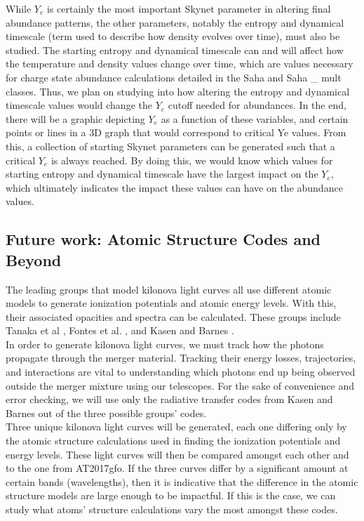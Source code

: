 \documentclass[11pt,a4paper]{article}
\begin{document}
While $Y_e$ is certainly the most important Skynet parameter in altering final abundance patterns, the other parameters, notably the entropy and dynamical timescale (term used to describe how density evolves over time), must also be studied. The starting entropy and dynamical timescale can and will affect how the temperature and density values change over time, which are values necessary for charge state abundance calculations detailed in the Saha and Saha \_ mult classes. 
Thus, we plan on studying into how altering the entropy and dynamical timescale values would change the $Y_e$ cutoff needed for abundances. In the end, there will be a graphic depicting $Y_e$ as a function of these variables, and certain points or lines in a 3D graph that would correspond to critical Ye values. From this, a collection of starting Skynet parameters can be generated such that a critical $Y_e$ is always reached. By doing this, we would know which values for starting entropy and dynamical timescale have the largest impact on the $Y_e$, which ultimately indicates the impact these values can have on the abundance values. 


\subsection{Future work: Atomic Structure Codes and Beyond}

The leading groups that model kilonova light curves all use different atomic models to generate ionization potentials and atomic energy levels. With this, their associated opacities and spectra can be calculated.  These groups include Tanaka et al \cite{Tanaka_2018} , Fontes et al. \cite{Fontes_2020} , and Kasen and Barnes \cite{Barnes_Kasen_2013} . \\

In order to generate kilonova light curves, we must track how the photons propagate through the merger material. Tracking their energy losses, trajectories, and interactions are vital to understanding which photons end up being observed outside the merger mixture using our telescopes. For the sake of convenience and error checking, we will use only the radiative transfer codes from Kasen and Barnes out of the three possible groups' codes.\\

Three unique kilonova light curves will be generated, each one differing only by the atomic structure calculations used in finding the ionization potentials and energy levels. These light curves will then be compared amongst each other and to the one from AT2017gfo. If the three curves differ by a significant amount at certain bands (wavelengths), then it is indicative that the difference in the atomic structure models are large enough to be impactful. If this is the case, we can study what atoms' structure calculations vary the most amongst these codes.\\  
\end{document}
